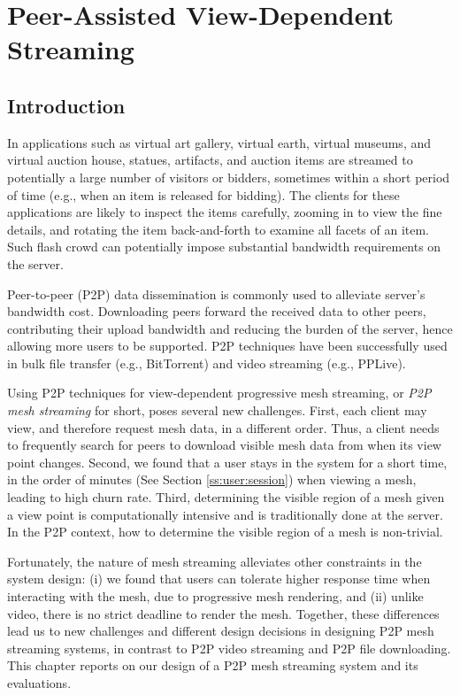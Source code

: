 \chapter{Peer-Assisted View-Dependent Streaming}
\label{c:p2p}
\section{Introduction}
    In applications such as virtual art gallery, virtual
    earth, virtual museums, and virtual auction house,
    statues, artifacts, and auction items are streamed to
    potentially a large number of visitors or bidders,
    sometimes within a short period of time (e.g., when an
    item is released for bidding).  The clients for these
    applications are likely to inspect the items carefully,
    zooming in to view the fine details, and rotating the
    item back-and-forth to examine all facets of an item.
    Such flash crowd can potentially impose substantial
    bandwidth requirements on the server.

    Peer-to-peer (P2P) data dissemination is commonly used to
    alleviate server's bandwidth cost.  Downloading
    peers forward the received data to other peers,
    contributing their upload bandwidth and reducing the
    burden of the server, hence allowing more users to
    be supported.  P2P techniques have been successfully used 
    in bulk file transfer (e.g., BitTorrent) and video
    streaming (e.g., PPLive).

    Using P2P techniques for view-dependent progressive mesh
    streaming, or \textit{P2P mesh streaming} for short, poses 
    several new challenges.  First, each
    client may view, and therefore request mesh data, in a 
    different order.
    Thus, a client needs
    to frequently search for peers to download visible mesh
    data from when its view point changes.  Second, we
    found that a user stays in the system for a short time,
    in the order of minutes (See Section \ref{ss:user:session})
    when viewing a mesh, leading to high churn rate.  Third,
    determining the visible region of a mesh given a view
    point is computationally intensive and is
    traditionally done at the server.  In the P2P context,
    how to determine the visible region of a mesh is
    non-trivial.

    Fortunately, the nature of mesh streaming alleviates
    other constraints in the system design:  (i) we found
    that users can tolerate higher response time when
    interacting with the mesh, due to progressive mesh rendering, 
    and (ii) unlike video, there is no strict 
    deadline to render the mesh.
    Together, these differences 
    lead us to new challenges and different design decisions in 
    designing P2P mesh streaming systems, in contrast to P2P
    video streaming and P2P file downloading.  This chapter
    reports on our design of a P2P mesh streaming system and
    its evaluations.

